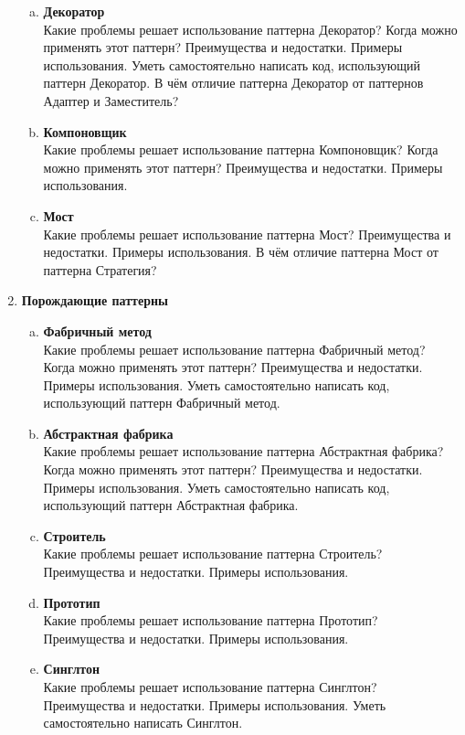 \documentclass{article}
\begin{document}
\begin{enumerate}
\begin{enumerate}[a.]
\item \textbf{Декоратор}\\
Какие проблемы решает использование паттерна Декоратор? Когда можно применять этот паттерн? Преимущества и недостатки. Примеры использования. Уметь самостоятельно написать код, использующий паттерн Декоратор. В чём отличие паттерна Декоратор от паттернов Адаптер и Заместитель?

\item \textbf{Компоновщик}\\
Какие проблемы решает использование паттерна Компоновщик? Когда можно применять этот паттерн? Преимущества и недостатки. Примеры использования.
 
\item \textbf{Мост}\\
Какие проблемы решает использование паттерна Мост? Преимущества и недостатки. Примеры использования. В чём отличие паттерна Мост от паттерна Стратегия?

\end{enumerate}

\item \textbf{Порождающие паттерны}
\begin{enumerate}[a.]
\item \textbf{Фабричный метод}\\
Какие проблемы решает использование паттерна Фабричный метод? Когда можно применять этот паттерн? Преимущества и недостатки. Примеры использования. Уметь самостоятельно написать код, использующий паттерн Фабричный метод.

\item \textbf{Абстрактная фабрика}\\
Какие проблемы решает использование паттерна Абстрактная фабрика? Когда можно применять этот паттерн? Преимущества и недостатки. Примеры использования. Уметь самостоятельно написать код, использующий паттерн Абстрактная фабрика.

\item \textbf{Строитель}\\
Какие проблемы решает использование паттерна Строитель? Преимущества и недостатки. Примеры использования.

\item \textbf{Прототип}\\
Какие проблемы решает использование паттерна Прототип? Преимущества и недостатки. Примеры использования.

\item \textbf{Синглтон}\\
Какие проблемы решает использование паттерна Синглтон? Преимущества и недостатки. Примеры использования. Уметь самостоятельно написать Синглтон.

\end{enumerate}

\end{enumerate}
\end{document}
